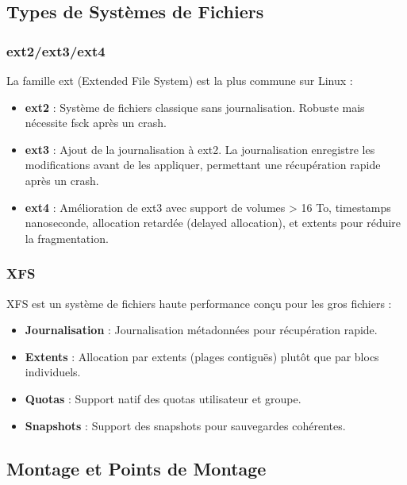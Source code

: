 \documentclass[12pt,a4paper]{article}
\begin{document}
\subsection{Types de Systèmes de Fichiers}

\subsubsection{ext2/ext3/ext4}

La famille ext (Extended File System) est la plus commune sur Linux :

\begin{itemize}
    \item \textbf{ext2} : Système de fichiers classique sans journalisation. Robuste mais nécessite fsck après un crash.
    
    \item \textbf{ext3} : Ajout de la journalisation à ext2. La journalisation enregistre les modifications avant de les appliquer, permettant une récupération rapide après un crash.
    
    \item \textbf{ext4} : Amélioration de ext3 avec support de volumes > 16 To, timestamps nanoseconde, allocation retardée (delayed allocation), et extents pour réduire la fragmentation.
\end{itemize}

\subsubsection{XFS}

XFS est un système de fichiers haute performance conçu pour les gros fichiers :

\begin{itemize}
    \item \textbf{Journalisation} : Journalisation métadonnées pour récupération rapide.
    \item \textbf{Extents} : Allocation par extents (plages contiguës) plutôt que par blocs individuels.
    \item \textbf{Quotas} : Support natif des quotas utilisateur et groupe.
    \item \textbf{Snapshots} : Support des snapshots pour sauvegardes cohérentes.
\end{itemize}

\subsection{Montage et Points de Montage}
\end{document}
